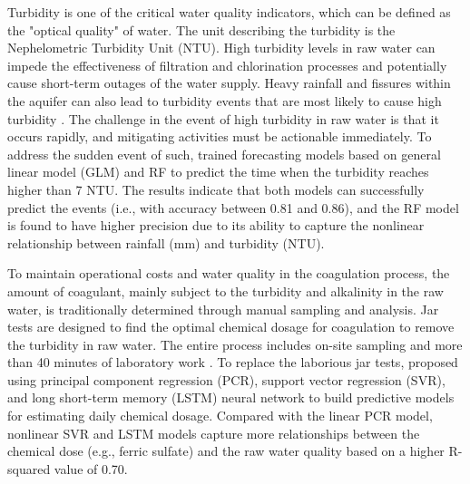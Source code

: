 Turbidity is one of the critical water quality indicators, which can be defined as the "optical quality" of water. The unit describing the turbidity is the Nephelometric Turbidity Unit (NTU). High turbidity levels in raw water can impede the effectiveness of filtration and chlorination processes and potentially cause short-term outages of the water supply. Heavy rainfall and fissures within the aquifer can also lead to turbidity events that are most likely to cause high turbidity \citep{worldhealthorganizationWaterQualityHealth2017}. The challenge in the event of high turbidity in raw water is that it occurs rapidly, and mitigating activities must be actionable immediately. To address the sudden event of such, \citet{stevensonAdvancedTurbidityPrediction2019} trained forecasting models based on general linear model (GLM) and RF to predict the time when the turbidity reaches higher than 7 NTU. The results indicate that both models can successfully predict the events (i.e., with accuracy between 0.81 and 0.86), and the RF model is found to have higher precision due to its ability to capture the nonlinear relationship between rainfall (mm) and turbidity (NTU).

To maintain operational costs and water quality in the coagulation process, the amount of coagulant, mainly subject to the turbidity and alkalinity in the raw water, is traditionally determined through manual sampling and analysis. Jar tests are designed to find the optimal chemical dosage for coagulation to remove the turbidity in raw water. The entire process includes on-site sampling and more than 40 minutes of laboratory work \citep{ganiEffectPHAlum2017}. To replace the laborious jar tests, \citet{wangIntegratingWaterQuality2022} proposed using principal component regression (PCR), support vector regression (SVR), and long short-term memory (LSTM) neural network to build predictive models for estimating daily chemical dosage. Compared with the linear PCR model, nonlinear SVR and LSTM models capture more relationships between the chemical dose (e.g., ferric sulfate) and the raw water quality based on a higher R-squared value of 0.70.


